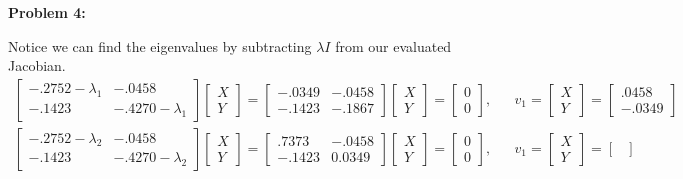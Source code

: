 \documentclass[11pt]{article}
\newenvironment{problem}[1]{\textbf{Problem #1: }}{\newpage}
\begin{document}
\begin{problem}{4}
\begin{enumerate}[label = (\alph*)]
\begin{enumerate}[label = (\roman*)]
				Notice we can find the eigenvalues by subtracting $\lambda I$ from our evaluated Jacobian.
				\begin{align*}
					\begin{bmatrix}
					-.2752 - \lambda_1 & -.0458\\
					-.1423 & -.4270 - \lambda_1
					\end{bmatrix}\begin{bmatrix}
						X \\ Y
					\end{bmatrix} = 
					\begin{bmatrix}
					-.0349 & -.0458 \\
					-.1423 & -.1867
					\end{bmatrix}\begin{bmatrix}
					X \\ Y
					\end{bmatrix} = 
					\begin{bmatrix}
					 0 \\ 0
					\end{bmatrix}, && 
					v_1 = \begin{bmatrix}
						X \\ Y
					\end{bmatrix} =	\begin{bmatrix}
						.0458 \\ -.0349
					\end{bmatrix} \\
					\begin{bmatrix}
					-.2752 - \lambda_2 & -.0458\\
					-.1423 & -.4270 - \lambda_2
					\end{bmatrix}\begin{bmatrix}
					X \\ Y
					\end{bmatrix} = 
					\begin{bmatrix}
					.7373 & -.0458 \\
					-.1423 & 0.0349
					\end{bmatrix}\begin{bmatrix}
					X \\ Y
					\end{bmatrix} = 
					\begin{bmatrix}
					0 \\ 0
					\end{bmatrix}, && 
					v_1 = \begin{bmatrix}
					X \\ Y
					\end{bmatrix} =	\begin{bmatrix}

\end{bmatrix}
\end{align*}
\end{enumerate}
\end{enumerate}
\end{problem}
\end{document}
